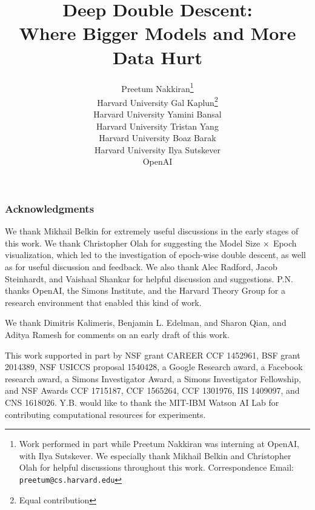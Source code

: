 \documentclass{article} %
\title{
Deep Double Descent:\\
Where Bigger Models and More Data Hurt
}
\author{Preetum Nakkiran\thanks{Work performed in part while Preetum Nakkiran was interning at OpenAI, with Ilya Sutskever.
We especially thank Mikhail Belkin and Christopher Olah for helpful discussions throughout
this work.
Correspondence Email: \texttt{preetum@cs.harvard.edu}}
\\Harvard University \And
Gal Kaplun\thanks{Equal contribution}\\Harvard University
\And
Yamini Bansal\footnotemark[2]\\Harvard University
\And Tristan Yang \\Harvard University \And
Boaz Barak \\Harvard University
\And
\hspace{-1.9in}Ilya Sutskever\\
\hspace{-1.9in}OpenAI
}
\begin{document}
\maketitle
\vspace{-0.4cm}


% 













%
\subsubsection*{Acknowledgments}
We thank Mikhail Belkin for extremely useful discussions in the early stages of this work.
We thank Christopher Olah for suggesting the Model Size $\times$ Epoch visualization, which led to the investigation of epoch-wise double descent,
as well as for useful discussion and feedback.
We also thank Alec Radford, Jacob Steinhardt, and Vaishaal Shankar for helpful discussion and suggestions.
P.N. thanks OpenAI, the Simons Institute, and the Harvard Theory Group for a research environment that enabled this kind of work.

We thank Dimitris Kalimeris, Benjamin L. Edelman, and Sharon Qian,
and Aditya Ramesh for comments on an early draft of this work.

This work supported in part by NSF grant CAREER CCF 1452961, BSF grant 2014389, NSF USICCS proposal 1540428, a Google Research award, a Facebook research award, a Simons Investigator Award,
a Simons Investigator Fellowship,
and NSF Awards
CCF 1715187,
CCF 1565264, CCF 1301976, IIS 1409097,
and CNS 1618026. Y.B. would like to thank the MIT-IBM Watson AI Lab for contributing computational resources for experiments.




\appendix
%

\end{document}
